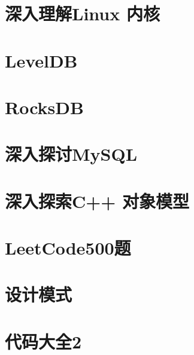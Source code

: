 \documentclass[UTF8,a4paper,12pt]{ctexbook}
\begin{document}
	\section{深入理解Linux 内核}
	
	\section{LevelDB}
	
	\section{RocksDB}
	
	\section{深入探讨MySQL}
	
	\section{深入探索C++ 对象模型}
	
	\section{LeetCode500题}
	
	\section{设计模式}
	
	\section{代码大全2}
	
\end{document}
